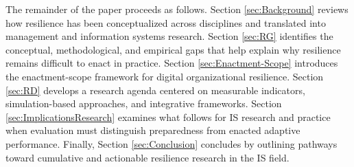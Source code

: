 The remainder of the paper proceeds as follows. Section \ref{sec:Background} reviews how resilience has been conceptualized across disciplines and translated into management and information systems research. Section \ref{sec:RG} identifies the conceptual, methodological, and empirical gaps that help explain why resilience remains difficult to enact in practice. Section \ref{sec:Enactment-Scope} introduces the enactment-scope framework for digital organizational resilience. Section \ref{sec:RD} develops a research agenda centered on measurable indicators, simulation-based approaches, and integrative frameworks. Section \ref{sec:ImplicationsResearch} examines what follows for IS research and practice when evaluation must distinguish preparedness from enacted adaptive performance. Finally, Section \ref{sec:Conclusion} concludes by outlining pathways toward cumulative and actionable resilience research in the IS field.
